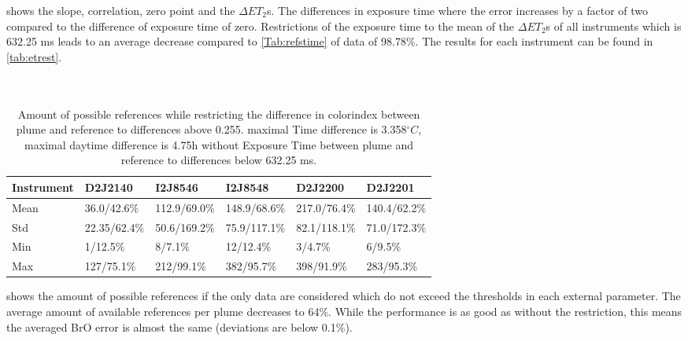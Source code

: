  shows the slope, correlation, zero point and the $\Delta ET_{2}$s. The differences in exposure time where the  error increases by a factor of two compared to the difference of exposure time of zero.
Restrictions of the exposure time to the mean of the $\Delta ET_{2}$s of all instruments which is 632.25 ms leads to an average decrease compared to \cref{Tab:refstime} of data of 98.78\%. The results for each instrument can be found in \cref{tab:etrest}.\\
\\
\\
\begin{table}
	\centering
	\begin{tabular}{|p{1.8cm}|p{2.15cm}|p{2.15cm}|p{2.15cm}|p{2.15cm}|p{2.15cm}|}
		Instrument	&D2J2140&I2J8546& I2J8548&D2J2200&D2J2201\\
		\toprule
		Mean&
		36.0/42.6\%&	112.9/69.0\%&
		148.9/68.6\%&	217.0/76.4\%&	140.4/62.2\%\\
		\midrule
		Std&
		22.35/62.4\%&
		50.6/169.2\% &
		75.9/117.1\%&
		82.1/118.1\% &
		71.0/172.3\% \\
		\midrule
		Min&
		1/12.5\%  &
		8/7.1\%  &
		12/12.4\%  &
		3/4.7\%   &
		6/9.5\%  \\
		\midrule
		Max
		&127/75.1\%
		&212/99.1\%
		&382/95.7\%
		&398/91.9\%
		&283/95.3\%\\
		\bottomrule
	\end{tabular}
	\label{tab:restrictall}
	\caption{Amount of possible references while restricting the difference in colorindex  between plume and reference to differences above 0.255. maximal Time difference is 3.358$^{\circ}C$, maximal daytime difference is 4.75h without Exposure Time  between plume and reference to differences below 632.25 ms.}
\end{table}	
 shows the amount of possible references if the only data are considered which do not exceed the thresholds in each external parameter.  The average amount of available references per plume decreases to 64\%. While the performance is as good as without the restriction, this means the averaged BrO error is almost the same (deviations are below 0.1\%).


